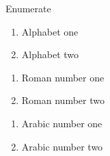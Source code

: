\begin{frame}{Enumerate}

    \begin{enumerate}[label={\alph*)}]
        \item Alphabet one
        \item Alphabet two
    \end{enumerate}
    
    \begin{enumerate}[label={\roman*.}]
        \item Roman number one
        \item Roman number two
    \end{enumerate}
    
    \begin{enumerate}[label={(\arabic*)}]
        \item Arabic number one
        \item Arabic number two
    \end{enumerate}
\end{frame}